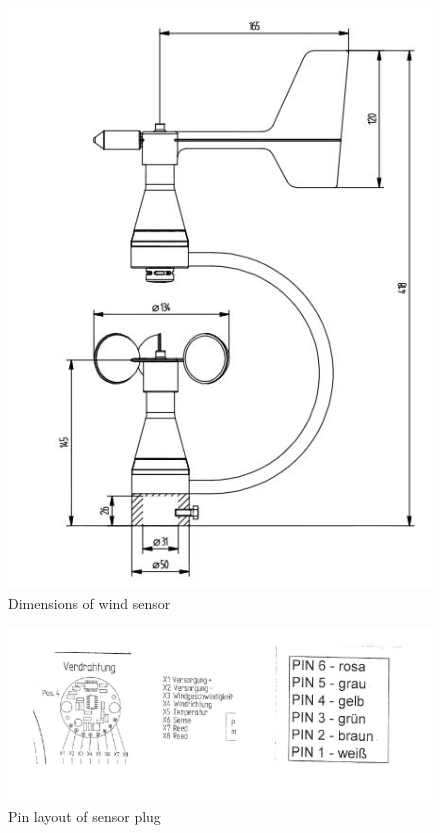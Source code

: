 \begin{figure}[ht]
    \centering
    \includegraphics[width=0.6\linewidth]{graphics/windsensor_dim.jpg}
    \caption{Dimensions of wind sensor}
    \label{fig:windsensor_dim}
\end{figure}

\begin{figure}[ht]
    \centering
    \includegraphics[width=0.6\linewidth]{graphics/pinlayout.jpg}
    \caption{Pin layout of sensor plug}
    \label{fig:pinlayout}
\end{figure}